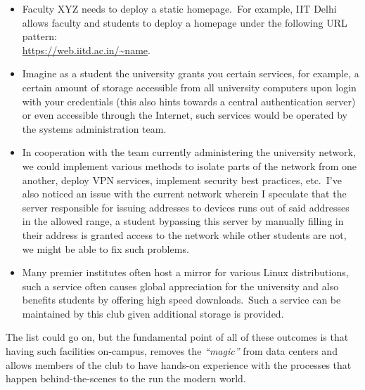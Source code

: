 \begin{itemize}
    \item Faculty XYZ needs to deploy a static homepage.\ For example, IIT Delhi allows faculty and students to
    deploy a homepage under the following URL pattern:\\
    \href{https://web.iitd.ac.in/~name}{\color{blue}\url{https://web.iitd.ac.in/~name}}.
    \item Imagine as a student the university grants you certain services, for example, a certain amount of storage
    accessible from all university computers upon login with your credentials (this also hints towards a central
    authentication server) or even accessible through the Internet, such services would be operated by the systems
    administration team.
    \item In cooperation with the team currently administering the university network, we could implement various
    methods to isolate parts of the network from one another, deploy VPN services, implement security best
    practices, etc.\ I've also noticed an issue with the current network wherein I speculate that the server
    responsible for issuing addresses to devices runs out of said addresses in the allowed range, a student
    bypassing this server by manually filling in their address is granted access to the network while other students
    are not, we might be able to fix such problems.
    \item Many premier institutes often host a mirror for various Linux distributions, such a service often causes
    global appreciation for the university and also benefits students by offering high speed downloads.\ Such a
    service can be maintained by this club given additional storage is provided.
\end{itemize}

The list could go on, but the fundamental point of all of these outcomes is that having such facilities on-campus,
removes the \emph{``magic''} from data centers and allows members of the club to have hands-on experience with the
processes that happen behind-the-scenes to the run the modern world.\\




